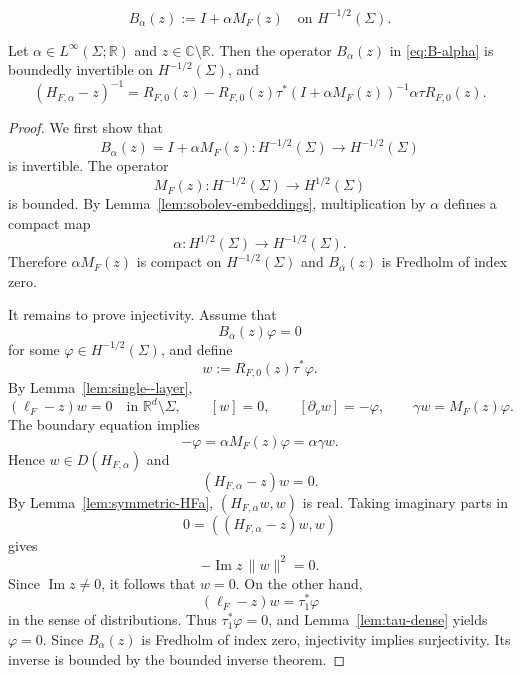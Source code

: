 \documentclass[10pt,a4paper]{amsart}
\begin{document}
\begin{equation}\label{eq:B-alpha}
B_\alpha(z):=I+\alpha M_F(z)
\quad\text{on }H^{-1/2}(\Sigma).
\end{equation}

\begin{thm}\label{thm:resolvent-new}
Let $\alpha\in L^\infty(\Sigma;\mathbb R)$ and $z\in\mathbb C\setminus\mathbb R$.
Then the operator $B_\alpha(z)$ in \eqref{eq:B-alpha} is boundedly invertible on $H^{-1/2}(\Sigma)$, and
\begin{equation}\label{eq:resolvent-new}
(H_{F,\alpha}-z)^{-1}
=
R_{F,0}(z)
-
R_{F,0}(z)\tau^*(I+\alpha M_F(z))^{-1}
\alpha\tau R_{F,0}(z).
\end{equation}
\end{thm}

\begin{proof}
We first show that
$$
B_\alpha(z)=I+\alpha M_F(z):H^{-1/2}(\Sigma)
\to H^{-1/2}(\Sigma)
$$
is invertible.
The operator
$$
M_F(z):H^{-1/2}(\Sigma)\to H^{1/2}(\Sigma)
$$
is bounded.
By Lemma~\ref{lem:sobolev-embeddings}, multiplication by $\alpha$ defines a compact map
$$
\alpha:H^{1/2}(\Sigma)\to H^{-1/2}(\Sigma).
$$
Therefore $\alpha M_F(z)$ is compact on $H^{-1/2}(\Sigma)$ and $B_\alpha(z)$ is Fredholm of index zero.

It remains to prove injectivity.
Assume that
$$
B_\alpha(z)\varphi=0
$$
for some $\varphi\in H^{-1/2}(\Sigma)$, and define
$$
w:=R_{F,0}(z)\tau^*\varphi.
$$
By Lemma~\ref{lem:single--layer},
$$
(\ell_F-z)w=0
\quad\text{in }\mathbb R^d\setminus\Sigma,
\qquad
[w]=0,
\qquad
[\partial_\nu w]=-\varphi,
\qquad
\gamma w=M_F(z)\varphi.
$$
The boundary equation implies
$$
-\varphi=\alpha M_F(z)\varphi=\alpha\gamma w.
$$
Hence $w\in D(H_{F,\alpha})$ and
$$
(H_{F,\alpha}-z)w=0.
$$
By Lemma~\ref{lem:symmetric-HFa}, $(H_{F,\alpha}w,w)$ is real.
Taking imaginary parts in
$$
0=((H_{F,\alpha}-z)w,w)
$$
gives
$$
-\operatorname{Im}z\,\|w\|^2=0.
$$
Since $\operatorname{Im}z\ne0$, it follows that $w=0$.
On the other hand,
$$
(\ell_F-z)w=\tau_1^*\varphi
$$
in the sense of distributions.
Thus $\tau_1^*\varphi=0$, and Lemma~\ref{lem:tau-dense} yields $\varphi=0$.
Since $B_\alpha(z)$ is Fredholm of index zero, injectivity implies surjectivity.
Its inverse is bounded by the bounded inverse theorem.


\end{proof}
\end{document}
